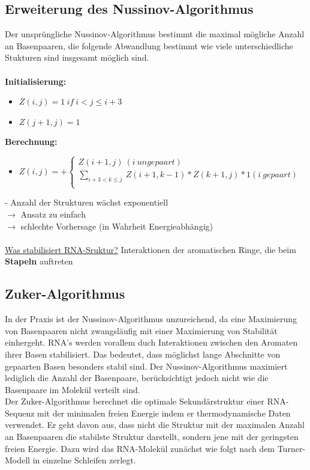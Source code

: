\subsection{Erweiterung des Nussinov-Algorithmus}

Der unspr\"ungliche Nussinov-Algorithmus bestimmt die maximal m\"ogliche Anzahl an Basenpaaren, die folgende Abwandlung bestimmt wie viele unterschiedliche Stukturen sind insgesamt m\"oglich sind.
\\\\
\textbf{Initialisierung:}
\begin{itemize}
	\item[] $Z(i,j)=1\ if\ i<j\le i+3$ 
	\item[] $Z(j+1, j) = 1$
\end{itemize}
\textbf{Berechnung:}
\begin{itemize}
	\item[]$Z(i,j)=+ \begin{cases}
               Z(i+1, j)\ (i~ungepaart)\\
               \displaystyle\sum_{i+3<k \le j}\ Z(i+1, k-1) * Z(k+1, j) * 1 (i~ gepaart)\\
\end{cases}$
\end{itemize}

 -  Anzahl der Strukturen wächst exponentiell\\
$\rightarrow$ Ansatz zu einfach\\
$\rightarrow$ schlechte Vorhersage (in Wahrheit Energieabhängig)\\
\\
\underline{Was stabilisiert RNA-Sruktur?} Interaktionen der aromatischen Ringe, die beim \textbf{Stapeln} auftreten

\subsection{Zuker-Algorithmus}
In der Praxis ist der Nussinov-Algorithmus unzureichend, da eine Maximierung von Basenpaaren nicht zwangsl\"aufig mit einer Maximierung von Stabilit\"at einhergeht. RNA's werden vorallem duch Interaktionen zwischen den Aromaten ihrer Basen stabilisiert. Das bedeutet, dass m\"oglichst lange Abschnitte von gepaarten Basen besonders stabil sind. Der Nussinov-Algorithmus maximiert lediglich die Anzahl der Basenpaare, ber\"ucksichtigt jedoch nicht wie die Basenpaare im Molekül verteilt sind. 
\\
Der Zuker-Algorithmus berechnet die optimale Sekundärstruktur einer RNA-Sequenz mit der minimalen freien Energie indem er thermodynamische Daten verwendet. Er geht davon aus, dass nicht die Struktur mit der maximalen Anzahl an Basenpaaren die stabilste Struktur darstellt, sondern jene mit der geringsten freien Energie. Dazu wird das RNA-Molek\"ul zunächst wie folgt nach dem Turner-Modell in einzelne Schleifen zerlegt.

